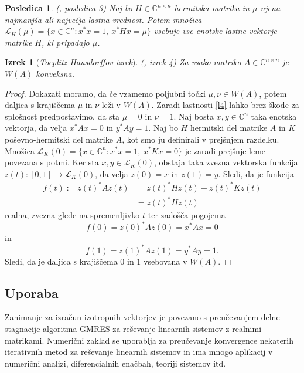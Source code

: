 \documentclass[12pt,a4paper]{amsart}
\theoremstyle{definition}
\theoremstyle{plain}
\newtheorem{izrek}[definicija]{Izrek}
\newtheorem{posledica}[definicija]{Posledica}
\newcommand{\LH}{\mathcal{L}}
\newcommand{\C}{\mathbb C}
\begin{document}
\begin{posledica}(\cite{zaloga}, posledica 3)
Naj bo $H\in \C^{n\times n}$ hermitska matrika in $\mu$ njena najmanjša ali največja lastna vrednost. Potem množica $\LH_{H}(\mu)=\{x\in \C^n\! : x^\ast x=1,\ x^\ast Hx=\mu \}$ vsebuje vse enotske lastne vektorje matrike $H$, ki pripadajo $\mu$.
\end{posledica}

\begin{izrek}[\emph{Toeplitz-Hausdorffov izrek}](\cite{zaloga}, izrek 4)
Za vsako matriko $A\in \C^{n\times n}$ je $W(A)$ konveksna.
\end{izrek}

\begin{proof}
Dokazati moramo, da če vzamemo poljubni točki $\mu, \nu \in W(A)$, potem daljica s krajiščema $\mu$ in $\nu$ leži v $W(A)$. Zaradi lastnosti \ref{l4} lahko brez škode za splošnost predpostavimo, da sta $\mu=0$ in $\nu=1$. Naj bosta $x,y\in \C^n$ taka enotska vektorja, da velja $x^\ast Ax=0$ in $y^\ast Ay=1$. 
Naj bo $H$ hermitski del matrike $A$ in $K$ poševno-hermitski del matrike $A$, kot smo ju definirali v prejšnjem razdelku. Množica $\LH_{K}(0) =\{x\in \C^n\! : x^\ast x=1,\ x^\ast Kx=0\}$ je zaradi prejšnje leme povezana s potmi. Ker sta $x,y\in \LH_{K}(0)$, obstaja taka zvezna vektorska funkcija $z(t): [0,1] \rightarrow \LH_{K}(0)$, da velja $z(0)=x$ in $z(1)=y$.  Sledi, da je funkcija 
\begin{align*}
f(t):= z(t)^\ast A z(t) &= z(t)^\ast Hz(t) +z(t)^\ast K z(t) \\
 &= z(t)^\ast Hz(t)
\end{align*}
realna, zvezna glede na spremenljivko $t$ ter zadošča pogojema $$f(0)= z(0)^\ast Az(0)=x^\ast Ax=0$$ in $$f(1)= z(1)^\ast Az(1)=y^\ast Ay=1.$$ Sledi, da je daljica s krajiščema $0$ in $1$ vsebovana v $W(A)$.
\end{proof}

\subsection{Uporaba}
Zanimanje za izračun izotropnih vektorjev je povezano s pre\-u\-če\-va\-njem delne stagnacije algoritma GMRES za reševanje linearnih sistemov z realnimi matrikami. Numerični zaklad se uporablja za preučevanje konvergence nekaterih iterativnih metod za reševanje linearnih sistemov in ima mnogo aplikacij v numerični analizi, diferencialnih enačbah, teoriji sistemov itd.
\end{document}
